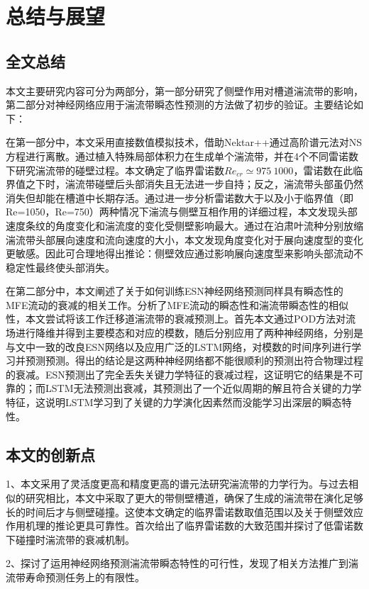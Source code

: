 \chapter{总结与展望}

\section{全文总结}
本文主要研究内容可分为两部分，第一部分研究了侧壁作用对槽道湍流带的影响，第二部分对神经网络应用于湍流带瞬态性预测的方法做了初步的验证。主要结论如下：

在第一部分中，本文采用直接数值模拟技术，借助Nektar++通过高阶谱元法对NS方程进行离散。通过植入特殊局部体积力在生成单个湍流带，并在4个不同雷诺数下研究湍流带的碰壁过程。本文确定了临界雷诺数$Re_{cr} \simeq 975~1000$，雷诺数在此临界值之下时，湍流带碰壁后头部消失且无法进一步自持；反之，湍流带头部虽仍然消失但却能在槽道中长期存活。通过进一步分析雷诺数大于以及小于临界值（即Re=1050，Re=750）两种情况下湍流与侧壁互相作用的详细过程，本文发现头部速度条纹的角度变化和湍流度的变化受侧壁影响最大。通过在泊肃叶流种分别放缩湍流带头部展向速度和流向速度的大小，本文发现角度变化对于展向速度型的变化更敏感。因此可合理地得出推论：侧壁效应通过影响展向速度型来影响头部流动不稳定性最终使头部消失。

在第二部分中，本文阐述了关于如何训练ESN神经网络预测同样具有瞬态性的MFE流动的衰减的相关工作。分析了MFE流动的瞬态性和湍流带瞬态性的相似性，本文尝试将该工作迁移道湍流带的衰减预测上。首先本文通过POD方法对流场进行降维并得到主要模态和对应的模数，随后分别应用了两种神经网络，分别是与文中一致的改良ESN网络以及应用广泛的LSTM网络，对模数的时间序列进行学习并预测预测。得出的结论是这两种神经网络都不能很顺利的预测出符合物理过程的衰减。ESN预测出了完全丢失关键力学特征的衰减过程，这证明它的结果是不可靠的；而LSTM无法预测出衰减，其预测出了一个近似周期的解且符合关键的力学特征，这说明LSTM学习到了关键的力学演化因素然而没能学习出深层的瞬态特性。

\section{本文的创新点}
1、本文采用了灵活度更高和精度更高的谱元法研究湍流带的力学行为。与过去相似的研究相比，本文中采取了更大的带侧壁槽道，确保了生成的湍流带在演化足够长的时间后才与侧壁碰撞。这使本文确定的临界雷诺数取值范围以及关于侧壁效应作用机理的推论更具可靠性。首次给出了临界雷诺数的大致范围并探讨了低雷诺数下碰撞时湍流带的衰减机制。

2、探讨了运用神经网络预测湍流带瞬态特性的可行性，发现了相关方法推广到湍流带寿命预测任务上的有限性。

